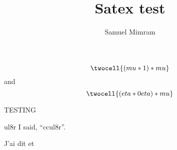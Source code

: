 \documentclass[a4paper]{article}
\title{Satex test}
\author{Samuel Mimram}
\begin{document}
\maketitle

\[
  \twocell{(mu * 1) * mu}
\]
and
\[
  \twocell{(eta *0 eta)
    *
    mu}
\]

TESTING

\expandafter\newcommand\csname cul8r
I said, ``\csname cul8r\endcsname''.

J'ai dit  et 
\end{document}
